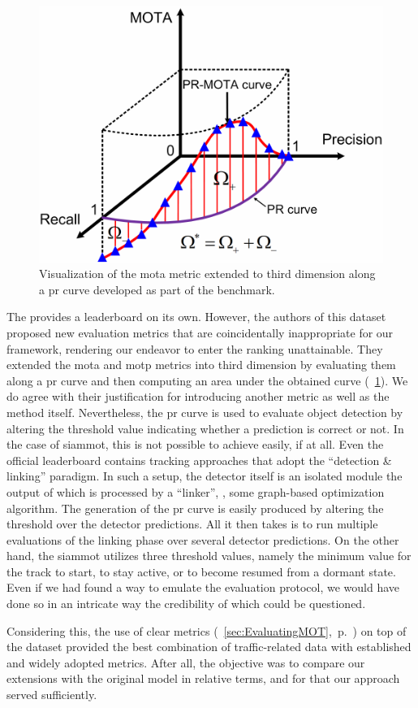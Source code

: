 \begin{figure}[t]
    \centerline{\includegraphics[width=0.5\linewidth]{figures/siamese_tracking/pr_mota_curve.pdf}}
    \caption[PR-\gls{mota} visualization]{Visualization of the \gls{mota} metric extended to third dimension along a \gls{pr} curve developed as part of the \uadetrac{} benchmark. }
    \label{fig:PRMOTAVisualization}
\end{figure}

The \uadetrac{} provides a leaderboard on its own. However, the authors of this dataset proposed new evaluation metrics that are coincidentally inappropriate for our framework, rendering our endeavor to enter the ranking unattainable. They extended the \gls{mota} and \gls{motp} metrics into third dimension by evaluating them along a \gls{pr} curve and then computing an area under the obtained curve (\figtext{}~\ref{fig:PRMOTAVisualization}). We do agree with their justification for introducing another metric as well as the method itself. Nevertheless, the \gls{pr} curve is used to evaluate object detection by altering the threshold value indicating whether a prediction is correct or not. In the case of \gls{siammot}, this is not possible to achieve easily, if at all. Even the official \uadetrac{} leaderboard contains tracking approaches that adopt the ``detection \& linking'' paradigm. In such a setup, the detector itself is an isolated module the output of which is processed by a ``linker'', \egtext{}, some graph-based optimization algorithm. The generation of the \gls{pr} curve is easily produced by altering the threshold over the detector predictions. All it then takes is to run multiple evaluations of the linking phase over several detector predictions. On the other hand, the \gls{siammot} utilizes three threshold values, namely the minimum value for the track to start, to stay active, or to become resumed from a dormant state. Even if we had found a way to emulate the evaluation protocol, we would have done so in an intricate way the credibility of which could be questioned.

Considering this, the use of \gls{clear} metrics (\sectiontext{}~\ref{sec:EvaluatingMOT},~p.~\pageref{sec:EvaluatingMOT}) on top of the \uadetrac{} dataset provided the best combination of traffic-related data with established and widely adopted metrics. After all, the objective was to compare our extensions with the original model in relative terms, and for that our approach served sufficiently.
